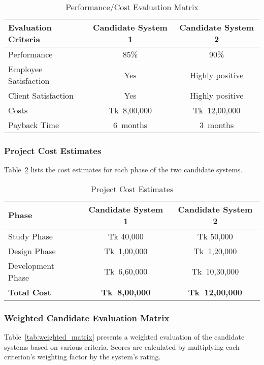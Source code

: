 \documentclass[12pt,a4paper]{article}
\begin{document}
\begin{table}[H]
    \centering
    \renewcommand{\arraystretch}{1.3}
    \begin{tabular}{|p{4cm}|c|c|}
        \hline
        \textbf{Evaluation Criteria} & \textbf{Candidate System 1} & \textbf{Candidate System 2} \\
        \hline
        Performance & 85\% & 90\% \\
        \hline
        Employee Satisfaction & Yes & Highly positive \\
        \hline
        Client Satisfaction & Yes & Highly positive \\
        \hline
        Costs & Tk 8{,}00{,}000 & Tk 12{,}00{,}000 \\
        \hline
        Payback Time & 6 months & 3 months \\
        \hline
    \end{tabular}
    \caption{Performance/Cost Evaluation Matrix}
    \label{tab:performance_cost}
\end{table}

\subsubsection{Project Cost Estimates}
Table~\ref{tab:cost_estimates} lists the cost estimates for each phase of the two candidate systems.

\begin{table}[H]
    \centering
    \renewcommand{\arraystretch}{1.3}
    \begin{tabular}{|p{3cm}|c|c|}
        \hline
        \textbf{Phase} & \textbf{Candidate System 1} & \textbf{Candidate System 2} \\
        \hline
        Study Phase & Tk 40{,}000 & Tk 50{,}000 \\
        \hline
        Design Phase & Tk 1{,}00{,}000 & Tk 1{,}20{,}000 \\
        \hline
        Development Phase & Tk 6{,}60{,}000 & Tk 10{,}30{,}000 \\
        \hline
        \textbf{Total Cost} & \textbf{Tk 8{,}00{,}000} & \textbf{Tk 12{,}00{,}000} \\
        \hline
    \end{tabular}
    \caption{Project Cost Estimates}
    \label{tab:cost_estimates}
\end{table}

\subsubsection{Weighted Candidate Evaluation Matrix}
Table~\ref{tab:weighted_matrix} presents a weighted evaluation of the candidate systems based on various criteria.  Scores are calculated by multiplying each criterion’s weighting factor by the system’s rating.
\end{document}
